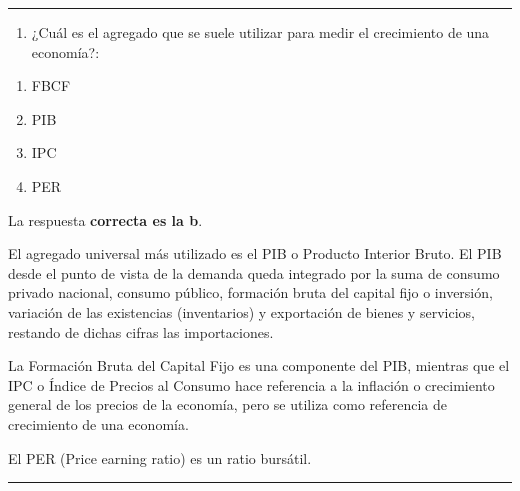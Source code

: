 \documentclass[
  letterpaper,
  DIV=11,
  numbers=noendperiod]{scrreprt}
\providecommand{\tightlist}{%
  \setlength{\itemsep}{0pt}\setlength{\parskip}{0pt}}\usepackage{longtable,booktabs,array}
\begin{document}
\begin{center}\rule{0.5\linewidth}{0.5pt}\end{center}

\begin{enumerate}
\def\labelenumi{\arabic{enumi}.}
\setcounter{enumi}{7}
\tightlist
\item
  ¿Cuál es el agregado que se suele utilizar para medir el crecimiento
  de una economía?:
\end{enumerate}

\begin{enumerate}
\def\labelenumi{\alph{enumi})}
\item
  FBCF
\item
  PIB
\item
  IPC
\item
  PER
\end{enumerate}

\begin{tcolorbox}[enhanced jigsaw, left=2mm, opacityback=0, colback=white, breakable, arc=.35mm, bottomrule=.15mm, rightrule=.15mm, toprule=.15mm, leftrule=.75mm, colframe=quarto-callout-tip-color-frame]
\begin{minipage}[t]{5.5mm}
\textcolor{quarto-callout-tip-color}{\faLightbulb}
\end{minipage}%
\begin{minipage}[t]{\textwidth - 5.5mm}

La respuesta \textbf{correcta es la b}.

El agregado universal más utilizado es el PIB o Producto Interior Bruto.
El PIB desde el punto de vista de la demanda queda integrado por la suma
de consumo privado nacional, consumo público, formación bruta del
capital fijo o inversión, variación de las existencias (inventarios) y
exportación de bienes y servicios, restando de dichas cifras las
importaciones.

La Formación Bruta del Capital Fijo es una componente del PIB, mientras
que el IPC o Índice de Precios al Consumo hace referencia a la inflación
o crecimiento general de los precios de la economía, pero se utiliza
como referencia de crecimiento de una economía.

El PER (Price earning ratio) es un ratio bursátil.

\end{minipage}%
\end{tcolorbox}

\begin{center}\rule{0.5\linewidth}{0.5pt}\end{center}
\end{document}
